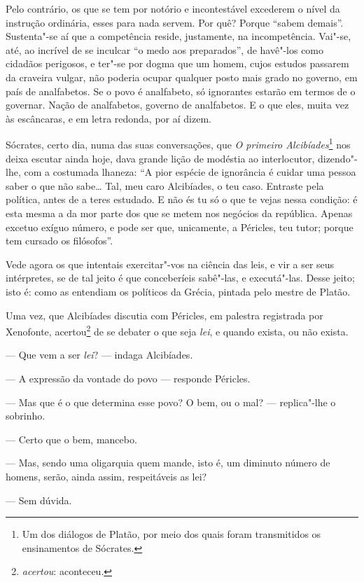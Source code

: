 Pelo contrário, os que se tem por notório e incontestável
excederem o nível da instrução ordinária, esses para nada servem. Por
quê? Porque ``sabem demais''. Sustenta"-se aí
que a competência reside, justamente, na incompetência. Vai"-se, até, ao
incrível de se inculcar ``o medo aos
preparados'', de havê"-los como cidadãos perigosos, e
ter"-se por dogma que um homem, cujos estudos passarem da craveira
vulgar, não poderia ocupar qualquer posto mais grado no governo, em
país de analfabetos. Se o povo é analfabeto, só ignorantes estarão em
termos de o governar. Nação de analfabetos, governo de analfabetos. E o
que eles, muita vez às escâncaras, e em letra redonda, por aí dizem.

Sócrates, certo dia,
numa das suas conversações, que \emph{O primeiro Alcibíades}\footnote{Um dos diálogos de Platão, por meio dos quais foram transmitidos os ensinamentos de Sócrates.} nos deixa escutar
ainda hoje, dava grande lição de modéstia ao interlocutor, dizendo"-lhe,
com a costumada lhaneza: ``A pior espécie de ignorância é
cuidar uma pessoa saber o que não sabe\ldots{} Tal, meu caro Alcibíades, o
teu caso. Entraste pela política, antes de a teres estudado. E não és
tu só o que te vejas nessa condição: é esta mesma a da mor parte dos
que se metem nos negócios da república. Apenas excetuo exíguo número, e
pode ser que, unicamente, a Péricles, teu tutor; porque tem cursado os filósofos''.

Vede agora os que intentais exercitar"-vos na ciência das leis, e
vir a ser seus intérpretes, se de tal jeito é que conceberíeis
sabê"-las, e executá"-las. Desse jeito; isto é: como as entendiam os
políticos da Grécia, pintada pelo mestre de Platão.

Uma vez, que Alcibíades discutia com Péricles, em palestra
registrada por Xenofonte, acertou\footnote{
\textit{acertou}: aconteceu.} de se debater o que seja \textit{lei}, e
quando exista, ou não exista.

--- Que vem a ser \textit{lei}? --- indaga Alcibíades.

--- A expressão da vontade do povo --- responde
Péricles.

--- Mas que é o que determina esse povo? O bem, ou o
mal? --- replica"-lhe o sobrinho.

--- Certo que o bem, mancebo.

--- Mas, sendo uma oligarquia quem mande, isto é, um
diminuto número de homens, serão, ainda assim, respeitáveis as lei?

--- Sem dúvida.

